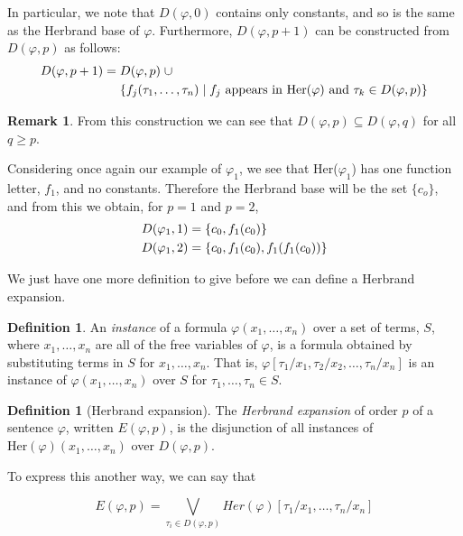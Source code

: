 \documentclass[a4paper,12pt]{report}
\theoremstyle{definition}
\newtheorem{mydef}[lem]{Definition}
\newtheorem{remark}[lem]{Remark}
\begin{document}
In particular, we note that $D(\varphi, 0)$ contains only constants, and so is the same as the Herbrand base of $\varphi$. Furthermore, $D(\varphi, p+1)$ can be constructed from $D(\varphi, p)$ as follows:
\begin{align}
D(\varphi, p+1) = \; & D(\varphi, p) \; \cup \notag \\
& \{ f_j (\tau_1, \ldots, \tau_n) \mid f_j \mbox{ appears in } \mbox{Her}(\varphi) \mbox{ and } \tau_k \in D(\varphi, p) \} \notag
\end{align}

\begin{remark}
\label{herb subsets}
From this construction we can see that $D(\varphi, p) \subseteq D(\varphi, q)$ for all $q \ge p$.
\end{remark}

Considering once again our example of $\varphi_1$, we see that Her($\varphi_1$) has one function letter, $f_1$, and no constants. Therefore the Herbrand base will be the set $ \{c_o \}$, and from this we obtain, for $p = 1$ and $p = 2$,
\begin{align}
D(\varphi_1, 1) &= \{ c_0 , f_1(c_0) \} \notag \\
D(\varphi_1, 2) &= \{ c_0, f_1(c_0) , f_1 (f_1 (c_0)) \} \notag
\end{align}

We just have one more definition to give before we can define a Herbrand expansion.

\begin{mydef}
An \emph{instance} of a formula $\varphi(x_1 , \ldots , x_n)$ over a set of terms, $S$, where $x_1 , \ldots , x_n$ are all of the free variables of $\varphi$, is a formula obtained by substituting terms in $S$ for $x_1 , \ldots , x_n$. That is, $\varphi [ \tau_1 / x_1, \tau_2 / x_2, \ldots , \tau_n / x_n ] $ is an instance of $\varphi(x_1 , \ldots , x_n)$ over $S$ for $\tau_1 , \ldots , \tau_n \in S$.
\end{mydef}

\begin{mydef}[Herbrand expansion]
\label{herbexp}
The \emph{Herbrand expansion} of order $p$ of a sentence $\varphi$, written $E(\varphi, p)$, is the disjunction of all instances of $\mbox{Her}(\varphi)(x_1, \ldots , x_n)$ over $D(\varphi, p)$.
\end{mydef}

To express this another way, we can say that

$$
E(\varphi, p) = \bigvee \limits_{\tau_i \in D(\varphi, p)} Her ( \varphi)[\tau_1 / x_1 , \ldots, \tau_n / x_n ]
$$
\end{document}
